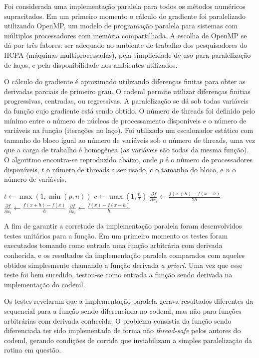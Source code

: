 \documentclass[cic,tc]{iiufrgs}
\begin{document}
Foi considerada uma implementação paralela para todos os métodos numéricos
supracitados. Em um primeiro momento o cálculo do gradiente foi paralelizado
utilizando OpenMP, um modelo de programação paralela para sistemas com
múltiplos processadores com memória compartilhada.\cite{chandra2001parallel} A
escolha de OpenMP se dá por três fatores: ser adequado ao ambiente de trabalho
dos pesquisadores do HCPA (máquinas multiprocessadas), pela simplicidade de uso
para paralelização de laços, e pela disponibilidade nos ambientes utilizados.

O cálculo do gradiente é aproximado utilizando diferenças finitas para obter as
derivadas parciais de primeiro grau. O codeml permite utilizar diferenças
finitias progressivas, centradas, ou regressivas. A paralelização se dá sob
todas variáveis da função cujo gradiente está sendo obtido. O número de threads
foi definido pelo mínimo entre o número de núcleos de processamento disponíveis
e o número de variáveis na função (iterações no laço). Foi utilizado um
escalonador estático com tamanho do bloco igual ao número de variáveis sob o
número de threads, uma vez que a carga de trabalho é homogênea (as variáveis
são todas da mesma função). O algoritmo encontra-se reproduzido abaixo, onde
$p$ é o número de processadores disponíveis, $t$ o número de threads a ser
usado, $c$ o tamanho do bloco, e $n$ o número de variáveis.

\begin{algorithmic}
\State $t \gets \max(1, \min(p, n))$
\State $c \gets \max(1, \frac{n}{t})$
    \State $\frac{\partial f}{\partial x_i} \gets \frac{f(x+h)-f(x-h)}{2h}$
    \State $\frac{\partial f}{\partial x_i} \gets \frac{f(x+h)-f(x)}{h}$
  \Else
    \State $\frac{\partial f}{\partial x_i} \gets \frac{f(x)-f(x-h)}{h}$
  \EndIf
\EndFor
\end{algorithmic}

A fim de garantir a corretude da implementação paralela foram desenvolvidos
testes unitários para a função. Em um primeiro momento os testes foram
executados tomando como entrada uma função arbitrária com derivada conhecida,
e os resultados da implementação paralela comparados com aqueles obtidos
simplesmente chamando a função derivada \textit{a priori}. Uma vez que esse
teste foi bem sucedido, testou-se como entrada a função sendo derivada na
implementação do codeml.

Os testes revelaram que a implementação paralela gerava resultados diferentes
da sequencial para a função sendo diferenciada no codeml, mas não para funções
arbitrárias com derivada conhecida. O problema consistia da função sendo
diferenciada ter sido implementada de forma não \textit{thread-safe} pelos
autores do codeml, gerando condições de corrida que inviabilizam a simples
paralelização da rotina em questão.
\end{document}
